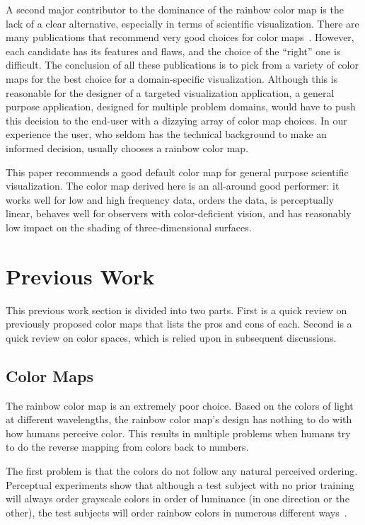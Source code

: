 \documentclass{acmsiggraph}               %
\newcommand{\lcite}[1]{~\cite{#1}}
\begin{document}
A second major contributor to the dominance of the rainbow color map is the
lack of a clear alternative, especially in terms of scientific
visualization.  There are many publications that recommend
very good choices for color maps\lcite{Brewer05,Levkowitz92,Rheingans99,Ware04}.
However, each candidate has its features and flaws, and the choice of
the ``right'' one is difficult.  The conclusion of
all these publications is to pick from a variety of color maps for the best
choice for a domain-specific visualization.  Although this is reasonable
for the designer of a targeted visualization application, a general
purpose application, designed for multiple problem domains, would have to
push this decision to the end-user with a dizzying array of color map
choices.  In our experience the user, who seldom has the technical
background to make an informed decision, usually chooses a rainbow color map.

This paper recommends a good default
color map for general purpose scientific visualization.  The
color map derived here is an all-around good performer: it works well for
low and high frequency data, orders the data, is perceptually linear,
behaves well for observers with color-deficient vision, and has reasonably
low impact on the shading of three-dimensional surfaces.


\section{Previous Work}
\label{sec:PreviousWork}

This previous work section is divided into two parts.  First is a
quick review on previously proposed color maps that lists the pros and
cons of each.  Second is a quick review on color spaces,
which is relied upon in subsequent discussions.

\subsection{Color Maps}
\label{sec:PreviousWork:ColorMaps}

The rainbow color map is an
extremely poor choice.  Based on the colors of light at different
wavelengths, the rainbow color map's design has nothing to do with how
humans perceive color.  This results in multiple problems when humans try
to do the reverse mapping from colors back to numbers.

The first problem is that the colors do not follow any natural perceived
ordering.  Perceptual experiments show that although a test subject with no
prior training will always order grayscale colors in order of luminance (in
one direction or the other), the test subjects will order rainbow colors in
numerous different ways\lcite{Ware04}.
\end{document}
